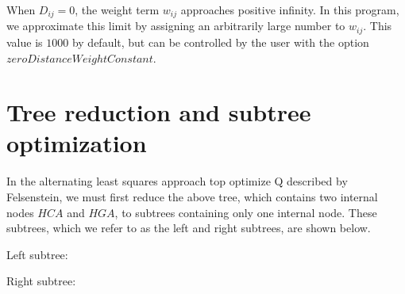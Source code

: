 \documentclass{article} %
\begin{document}
When $D_{ij} = 0$, the weight term $w_{ij}$ approaches positive infinity. In this program, we approximate this limit by assigning an arbitrarily large number to $w_{ij}$. This value is $1000$ by default, but can be controlled by the user with the option $zeroDistanceWeightConstant$.

\section{Tree reduction and subtree optimization}
In the alternating least squares approach top optimize Q described by Felsenstein, we must first reduce the above tree, which contains two internal nodes $HCA$ and $HGA$, to subtrees containing only one internal node. These subtrees, which we refer to as the left and right subtrees, are shown below.

Left subtree:
\begin{center}
\end{center}

Right subtree:
\begin{center}
\end{center}
\end{document}
